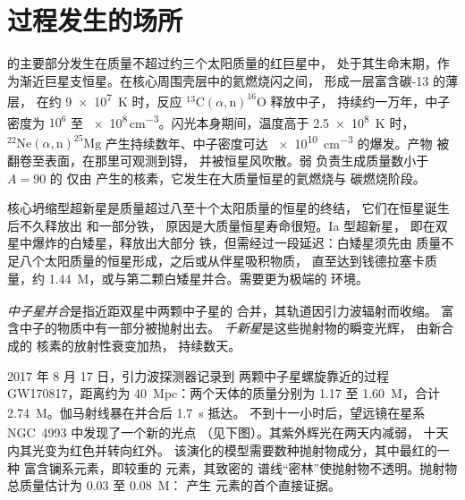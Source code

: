 \section{过程发生的场所}\label{sec:b3:origin-of-elements:sites}

的主要部分发生在质量不超过约三个太阳质量的红巨星中，
处于其生命末期，作为渐近巨星支恒星。在核心周围壳层中的氦燃烧闪之间，
形成一层富含碳-13 的薄层，
在约 \qty{9e7}{K} 时，反应
$^{13}\mathrm{C}(\alpha,\mathrm{n})^{16}\mathrm{O}$ 释放中子，
持续约一万年，中子密度为 $10^6$ 至
\num{e8}\,\unit{cm^{-3}}。闪光本身期间，温度高于
\qty{2.5e8}{K} 时，$^{22}\mathrm{Ne}(\alpha,\mathrm{n})^{25}\mathrm{Mg}$
产生持续数年、中子密度可达 \qty{e10}{cm^{-3}} 的爆发。产物
被翻卷至表面，在那里可观测到锝，
并被恒星风吹散。弱 负责生成质量数小于 $A = 90$ 的
仅由 产生的核素，它发生在大质量恒星的氦燃烧与
碳燃烧阶段。

核心坍缩型超新星是质量超过八至十个太阳质量的恒星的终结，
它们在恒星诞生后不久释放出 和一部分铁，
原因是大质量恒星寿命很短。Ia 型超新星，
即在双星中爆炸的白矮星，释放出大部分
铁，但需经过一段延迟：白矮星须先由
质量不足八个太阳质量的恒星形成，之后或从伴星吸积物质，
直至达到钱德拉塞卡质量，约
\qty{1.44}{M_\odot}，或与第二颗白矮星并合。需要更为极端的
环境。

\begin{definition}\label{def:b3:origin-of-elements:kilonova}
\emph{中子星并合}是指近距双星中两颗中子星的
合并，其轨道因引力波辐射而收缩。
富含中子的物质中有一部分被抛射出去。
\emph{千新星}是这些抛射物的瞬变光辉，
由新合成的 核素的放射性衰变加热，
持续数天。
\end{definition}

2017 年 8 月 17 日，引力波探测器记录到
两颗中子星螺旋靠近的过程 GW170817，距离约为
\qty{40}{Mpc}：两个天体的质量分别为 \num{1.17} 至 \qty{1.60}{M_\odot}，合计
\qty{2.74}{M_\odot}。伽马射线暴在并合后 \qty{1.7}{s} 抵达。
不到十一小时后，望远镜在星系 NGC~4993 中发现了一个新的光点
（见下图）。其紫外辉光在两天内减弱，
十天内其光变为红色并转向红外。
该演化的模型需要数种抛射物成分，其中最红的一种
富含镧系元素，即较重的 元素，其致密的
谱线“密林”使抛射物不透明。抛射物总质量估计为
\num{0.03} 至 \qty{0.08}{M_\odot}：
产生 元素的首个直接证据。

